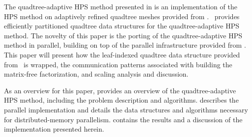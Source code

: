 The quadtree-adaptive HPS method presented in \citep{chipman2024fast} is an implementation of the HPS method on adaptively refined quadtree meshes provided from \pforest \citep{burstedde2011p4est,burstedde2020parallel}. \pforest\ provides efficiently partitioned quadtree data structures for the quadtree-adaptive HPS method. The novelty of this paper is the porting of the quadtree-adaptive HPS method in parallel, building on top of the parallel infrastructure provided from \pforest. This paper will present how the leaf-indexed quadtree data structure provided from \pforest\ is wrapped, the communication patterns associated with building the matrix-free factorization, and scaling analysis and discussion.


As an overview for this paper,  provides an overview of the quadtree-adaptive HPS method, including the problem description and algorithms.  describes the parallel implementation and details the data structures and algorithms necessary for distributed-memory parallelism.  contains the results and a discussion of the implementation presented herein.